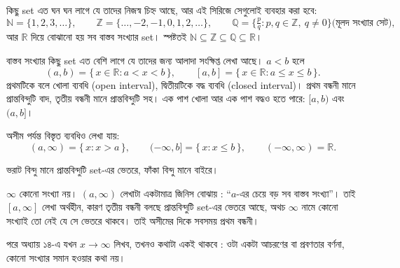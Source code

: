 \documentclass[11pt]{article}
\begin{document}
\noindent
কিছু set এত ঘন ঘন লাগে যে তাদের নিজস্ব চিহ্ন আছে, আর এই সিরিজে সেগুলোই
ব্যবহার করা হবে:
\[
  \mathbb{N} = \{1, 2, 3, \dots\}, \qquad
  \mathbb{Z} = \{\dots, -2, -1, 0, 1, 2, \dots\}, \qquad
  \mathbb{Q} = \Big\{ \tfrac{p}{q} : p, q \in \mathbb{Z},\ q \neq 0 \Big\} \text{(মূলদ সংখ্যার সেট)},
\]
আর $\mathbb{R}$ দিয়ে বোঝানো হয় সব বাস্তব সংখ্যার set। স্পষ্টতই
$\mathbb{N} \subseteq \mathbb{Z} \subseteq \mathbb{Q} \subseteq \mathbb{R}$।

\begin{idea}[ব্যবধি]
বাস্তব সংখ্যার কিছু set এত বেশি লাগে যে তাদের জন্য আলাদা সংক্ষিপ্ত লেখা আছে।
$a < b$ হলে
\[
  (a, b) = \{\, x \in \mathbb{R} : a < x < b \,\}, \qquad
  [a, b] = \{\, x \in \mathbb{R} : a \leq x \leq b \,\}.
\]
প্রথমটিকে বলে খোলা ব্যবধি (open interval), দ্বিতীয়টিকে বদ্ধ ব্যবধি (closed
interval)। প্রথম বন্ধনী মানে প্রান্তবিন্দুটি বাদ, তৃতীয় বন্ধনী মানে
প্রান্তবিন্দুটি সহ। এক পাশ খোলা আর এক পাশ বদ্ধও হতে পারে:
$[a, b)$ এবং $(a, b]$।

অসীম পর্যন্ত বিস্তৃত ব্যবধিও লেখা যায়:
\[
  (a, \infty) = \{\, x : x > a \,\}, \qquad
  (-\infty, b] = \{\, x : x \leq b \,\}, \qquad
  (-\infty, \infty) = \mathbb{R}.
\]
\end{idea}

\begin{center}
\end{center}

\noindent
ভরাট বিন্দু মানে প্রান্তবিন্দুটি set-এর ভেতরে, ফাঁকা বিন্দু মানে বাইরে।

\begin{remark}
$\infty$ কোনো সংখ্যা নয়। $(a, \infty)$ লেখাটা একটামাত্র জিনিস বোঝায় :
``$a$-এর চেয়ে বড় সব বাস্তব সংখ্যা''। তাই $[a, \infty]$ লেখা অর্থহীন, কারণ
তৃতীয় বন্ধনী বলছে প্রান্তবিন্দুটি set-এর ভেতরে আছে, অথচ $\infty$ নামে কোনো
সংখ্যাই তো নেই যে সে ভেতরে থাকবে। তাই অসীমের দিকে সবসময় প্রথম বন্ধনী।

পরে অধ্যায় ১৪-এ যখন $x \to \infty$ লিখব, তখনও কথাটা একই থাকবে :
ওটা একটা আচরণের বা প্রবণতার বর্ণনা, কোনো সংখ্যার সমান হওয়ার কথা নয়।
\end{remark}
\end{document}
